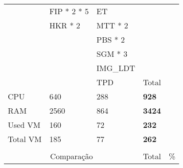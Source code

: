 \begin{table}[H]
\begin{tabular}{|l|l|l|l|l|}
    & \cellcolor[HTML]{A9D08E}FIP * 2 * 5                   & \cellcolor[HTML]{BDD7EE}ET                            &               &               \\ \cline{2-3} 
    & \cellcolor[HTML]{A9D08E}HKR * 2                       & \cellcolor[HTML]{BDD7EE}MTT * 2                       &               &               \\ \cline{3-3} 
    &                                                       & \cellcolor[HTML]{BDD7EE}PBS * 2                       &               &               \\ \cline{3-3} 
    &                                                       & \cellcolor[HTML]{BDD7EE}SGM * 3                       &               &               \\ \cline{3-3} 
    &                                                       & \cellcolor[HTML]{BDD7EE}IMG\_LDT                       &               &               \\ \cline{3-3} 
    &                                                       & \cellcolor[HTML]{BDD7EE}TPD                           & Total         &               \\ \cline{1-4}
    \cellcolor[HTML]{C0C0C0}CPU                             & 640                                                     & 288                                                     & \textbf{928}  &               \\ \cline{1-4}
    \cellcolor[HTML]{C0C0C0}RAM                             & 2560                                                    & 864                                                     & \textbf{3424} &               \\ \cline{1-4}
    \cellcolor[HTML]{C0C0C0}Used VM                         & 160                                                     & 72                                                      & \textbf{232}  &               \\ \cline{1-4}
    \cellcolor[HTML]{C0C0C0}Total VM                        & 185                                                     & 77                                                      & \textbf{262}  &               \\ \cline{1-4}
      &                                              &                                              &               &               \\ \cline{1-5}
    \multicolumn{3}{c}{\cellcolor[HTML]{C0C0C0}Comparação}                       & Total         & \%            \\ \cline{1-5}

\end{tabular}
\end{table}
